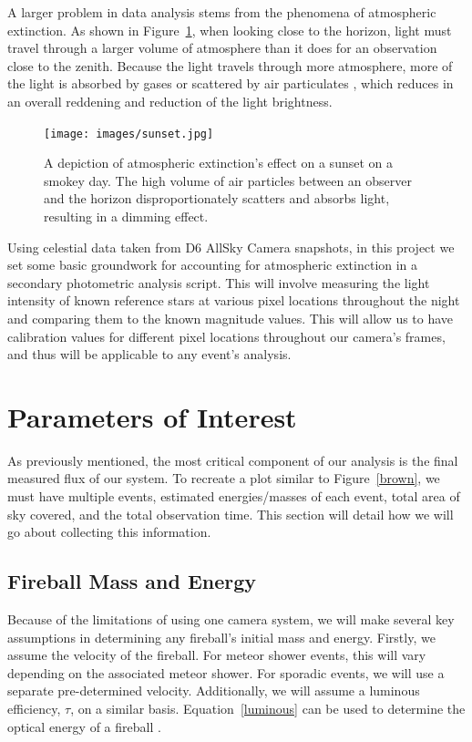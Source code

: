 A larger problem in data analysis stems from the phenomena of atmospheric extinction.
As shown in Figure~\ref{extinc}, when looking close to the horizon, light must travel through a larger volume of atmosphere than it does for an observation close to the zenith.  
Because the light travels through more atmosphere, more of the light is absorbed by gases or scattered by air particulates \cite{hughes_atmospheric_2016}, which reduces in an overall reddening and reduction of the light brightness.


\begin{figure}[ht!]
  \centering
  \texttt{[image: images/sunset.jpg]}
  \caption{A depiction of atmospheric extinction's effect on a sunset on a smokey day.  The high volume of air particles between an observer and the horizon disproportionately scatters and absorbs light, resulting in a dimming effect.}
  \label{extinc}
\end{figure}


Using celestial data taken from D6 AllSky Camera snapshots, in this project we set some basic groundwork for accounting for atmospheric extinction in a secondary photometric analysis script.
This will involve measuring the light intensity of known reference stars at various pixel locations throughout the night and comparing them to the known magnitude values.
This will allow us to have calibration values for different pixel locations throughout our camera's frames, and thus will be applicable to any event's analysis.


\section{Parameters of Interest}

As previously mentioned, the most critical component of our analysis is the final measured flux of our system. 
To recreate a plot similar to Figure~\ref{brown}, we must have multiple events, estimated energies/masses of each event, total area of sky covered, and the total observation time.
This section will detail how we will go about collecting this information.


\subsection{Fireball Mass and Energy}

Because of the limitations of using one camera system, we will make several key assumptions in determining any fireball's initial mass and energy.  
Firstly, we assume the velocity of the fireball.
For meteor shower events, this will vary depending on the associated meteor shower.
For sporadic events, we will use a separate pre-determined velocity.
Additionally, we will assume a luminous efficiency, $\tau$, on a similar basis.
Equation~\ref{luminous} can be used to determine the optical energy of a fireball \cite{brown_p_flux_2002}.

